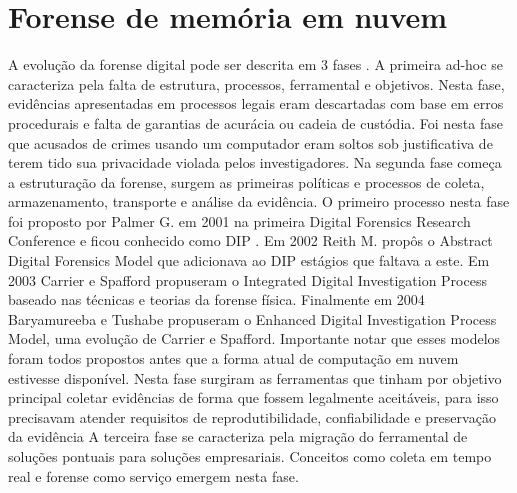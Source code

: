 \documentclass[conference]{IEEEtran}
\newcommand{\marcos}[1]{{\color{blue}{MARCOS: #1}}}
\begin{document}
\section{Forense de memória em nuvem}
\label{sec:forensics}

\marcos{Hum... o que você de fato uso desses conceitos no seu trabalho? Pergunto porque está muito com cara de ``aula de história'', e você pode imaginar o quanto um revisor da área de exatas gostava de aula de história no colégio... Na boa, vai direto aos pontos que interessam, deixando esse blá-blá-blá para outro lugar (pode incluir na dissertação, que não tem limite de páginas, mas não em um artigo)}
A evolução da forense digital pode ser descrita em 3 fases \cite{Charters2008}. 
%
A primeira ad-hoc se caracteriza pela falta de estrutura, processos, ferramental e objetivos. 
%
Nesta fase, evidências apresentadas em processos legais eram descartadas com base em erros procedurais e falta de garantias de acurácia ou cadeia de custódia. 
%
Foi nesta fase que acusados de crimes usando um computador eram soltos sob justificativa de terem tido sua privacidade violada pelos investigadores. 
%
Na segunda fase começa a estruturação da forense, surgem as primeiras políticas e processos de coleta, armazenamento, transporte e análise da evidência. 
%
O primeiro processo nesta fase foi proposto por Palmer G. em 2001 na primeira Digital Forensics Research Conference e ficou conhecido como DIP \marcos{É uma sigla? Se for, dê o nome completo}. 
%
Em 2002 Reith M. propôs o Abstract Digital Forensics Model que adicionava ao DIP estágios que faltava a este. 
%
Em 2003 Carrier e Spafford propuseram o Integrated Digital Investigation Process baseado nas técnicas e teorias da forense física. 
%
Finalmente em 2004 Baryamureeba e Tushabe propuseram o Enhanced Digital Investigation Process Model, uma evolução de Carrier e Spafford. 
%
Importante notar que esses modelos foram todos propostos antes que a forma atual de computação em nuvem estivesse disponível. \cite{Grispos2012}
%
Nesta fase surgiram as ferramentas que tinham por objetivo principal coletar evidências de forma que fossem legalmente aceitáveis, para isso precisavam atender requisitos de reprodutibilidade, confiabilidade e preservação da evidência
%
A terceira fase se caracteriza pela migração do ferramental de soluções pontuais para soluções empresariais. 
%
Conceitos como coleta em tempo real e forense como serviço emergem nesta fase.
\end{document}
